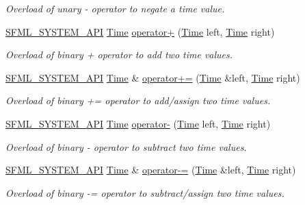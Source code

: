 \begin{DoxyCompactItemize}
\begin{DoxyCompactList}\small\item\em Overload of unary -\/ operator to negate a time value. \end{DoxyCompactList}\item 
\hyperlink{_system_2_export_8hpp_a6476c9e422606477a4c23d92b1d79a1f}{S\-F\-M\-L\-\_\-\-S\-Y\-S\-T\-E\-M\-\_\-\-A\-P\-I} \hyperlink{classsf_1_1_time}{Time} \hyperlink{classsf_1_1_time_a7155e965f238f8c32d63649b0189ef47}{operator+} (\hyperlink{classsf_1_1_time}{Time} left, \hyperlink{classsf_1_1_time}{Time} right)
\begin{DoxyCompactList}\small\item\em Overload of binary + operator to add two time values. \end{DoxyCompactList}\item 
\hyperlink{_system_2_export_8hpp_a6476c9e422606477a4c23d92b1d79a1f}{S\-F\-M\-L\-\_\-\-S\-Y\-S\-T\-E\-M\-\_\-\-A\-P\-I} \hyperlink{classsf_1_1_time}{Time} \& \hyperlink{classsf_1_1_time_a831c8df4b7b9b47eaa0c5a52a1be654c}{operator+=} (\hyperlink{classsf_1_1_time}{Time} \&left, \hyperlink{classsf_1_1_time}{Time} right)
\begin{DoxyCompactList}\small\item\em Overload of binary += operator to add/assign two time values. \end{DoxyCompactList}\item 
\hyperlink{_system_2_export_8hpp_a6476c9e422606477a4c23d92b1d79a1f}{S\-F\-M\-L\-\_\-\-S\-Y\-S\-T\-E\-M\-\_\-\-A\-P\-I} \hyperlink{classsf_1_1_time}{Time} \hyperlink{classsf_1_1_time_ace92ab9bc7aec80239af7218cd89cc80}{operator-\/} (\hyperlink{classsf_1_1_time}{Time} left, \hyperlink{classsf_1_1_time}{Time} right)
\begin{DoxyCompactList}\small\item\em Overload of binary -\/ operator to subtract two time values. \end{DoxyCompactList}\item 
\hyperlink{_system_2_export_8hpp_a6476c9e422606477a4c23d92b1d79a1f}{S\-F\-M\-L\-\_\-\-S\-Y\-S\-T\-E\-M\-\_\-\-A\-P\-I} \hyperlink{classsf_1_1_time}{Time} \& \hyperlink{classsf_1_1_time_aaf7888302cf4847f97cfc26875367b94}{operator-\/=} (\hyperlink{classsf_1_1_time}{Time} \&left, \hyperlink{classsf_1_1_time}{Time} right)
\begin{DoxyCompactList}\small\item\em Overload of binary -\/= operator to subtract/assign two time values. \end{DoxyCompactList}\item 

\end{DoxyCompactItemize}
